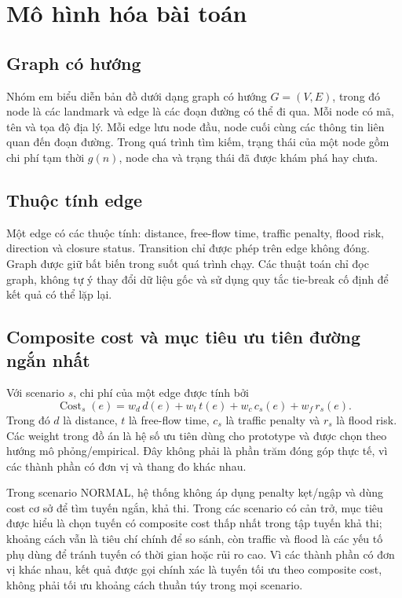 \section{Mô hình hóa bài toán}
\subsection{Graph có hướng}
Nhóm em biểu diễn bản đồ dưới dạng graph có hướng \(G=(V,E)\), trong đó node là các landmark và edge là các đoạn đường có thể đi qua. Mỗi node có mã, tên và tọa độ địa lý. Mỗi edge lưu node đầu, node cuối cùng các thông tin liên quan đến đoạn đường. Trong quá trình tìm kiếm, trạng thái của một node gồm chi phí tạm thời \(g(n)\), node cha và trạng thái đã được khám phá hay chưa.

\subsection{Thuộc tính edge}
Một edge có các thuộc tính: distance, free-flow time, traffic penalty, flood risk, direction và closure status. Transition chỉ được phép trên edge không đóng. Graph được giữ bất biến trong suốt quá trình chạy. Các thuật toán chỉ đọc graph, không tự ý thay đổi dữ liệu gốc và sử dụng quy tắc tie-break cố định để kết quả có thể lặp lại.

\subsection{Composite cost và mục tiêu ưu tiên đường ngắn nhất}
Với scenario \(s\), chi phí của một edge được tính bởi
\[
\operatorname{Cost}_s(e)=w_d\,d(e)+w_t\,t(e)+w_c\,c_s(e)+w_f\,r_s(e).
\]
Trong đó \(d\) là distance, \(t\) là free-flow time, \(c_s\) là traffic penalty và \(r_s\) là flood risk.
Các weight trong đồ án là hệ số ưu tiên dùng cho prototype và được chọn theo hướng mô phỏng/empirical. Đây không phải là phần trăm đóng góp thực tế, vì các thành phần có đơn vị và thang đo khác nhau.

Trong scenario NORMAL, hệ thống không áp dụng penalty kẹt/ngập và dùng cost cơ sở để tìm tuyến ngắn, khả thi. Trong các scenario có cản trở, mục tiêu được hiểu là chọn tuyến có composite cost thấp nhất trong tập tuyến khả thi; khoảng cách vẫn là tiêu chí chính để so sánh, còn traffic và flood là các yếu tố phụ dùng để tránh tuyến có thời gian hoặc rủi ro cao. Vì các thành phần có đơn vị khác nhau, kết quả được gọi chính xác là tuyến tối ưu theo composite cost, không phải tối ưu khoảng cách thuần túy trong mọi scenario.

